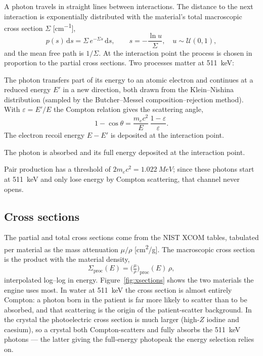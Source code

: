 \documentclass[11pt]{article}
\begin{document}
A photon travels in straight lines between interactions. The distance to the next interaction is
exponentially distributed with the material's total macroscopic cross section $\Sigma$
[\si{cm^{-1}}],
\begin{equation}
  p(s)\,\mathrm{d}s = \Sigma\, e^{-\Sigma s}\,\mathrm{d}s,
  \qquad s = -\frac{\ln u}{\Sigma}, \quad u\sim\mathcal{U}(0,1),
\end{equation}
and the mean free path is $1/\Sigma$. At the interaction point the process is chosen in proportion
to the partial cross sections. Two processes matter at \SI{511}{keV}:
\begin{description}[style=nextline,leftmargin=1.5em]
\item[Compton scattering.] The photon transfers part of its energy to an atomic electron and
continues at a reduced energy $E'$ in a new direction, both drawn from the Klein--Nishina
distribution (sampled by the Butcher--Messel composition--rejection method). With
$\varepsilon = E'/E$ the Compton relation gives the scattering angle,
\begin{equation}
  1 - \cos\theta = \frac{m_e c^2}{E}\,\frac{1-\varepsilon}{\varepsilon}.
\end{equation}
The electron recoil energy $E - E'$ is deposited at the interaction point.
\item[Photoelectric absorption.] The photon is absorbed and its full energy deposited at the
interaction point.
\end{description}
Pair production has a threshold of $2 m_e c^2 = \SI{1.022}{MeV}$; since these photons start at
\SI{511}{keV} and only lose energy by Compton scattering, that channel never opens.

\subsection{Cross sections}

The partial and total cross sections come from the NIST XCOM tables, tabulated per material as the
mass attenuation $\mu/\rho$ [\si{cm^2/g}]. The macroscopic cross section is the product with the
material density,
\begin{equation}
  \Sigma_{\mathrm{proc}}(E) = \Big(\tfrac{\mu}{\rho}\Big)_{\!\mathrm{proc}}(E)\,\rho ,
\end{equation}
interpolated log--log in energy. Figure~\ref{fig:xsections} shows the two materials the engine
uses most. In water at \SI{511}{keV} the cross section is almost entirely Compton: a photon born in
the patient is far more likely to scatter than to be absorbed, and that scattering is the origin of
the patient-scatter background. In the crystal the photoelectric cross section is much larger
(high-$Z$ iodine and caesium), so a crystal both Compton-scatters and fully absorbs the \SI{511}{keV}
photons --- the latter giving the full-energy photopeak the energy selection relies on.
\end{document}
